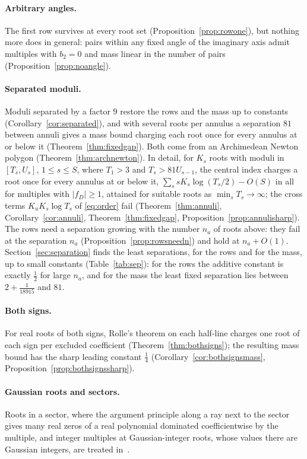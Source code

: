 \documentclass[11pt]{article}
\begin{document}
\paragraph{Arbitrary angles.}  The first row survives at every root set
(Proposition~\ref{prop:rowone}), but nothing more does in general: pairs
within any fixed angle of the imaginary axis admit multiples with $b_2=0$
and mass linear in the number of pairs (Proposition~\ref{prop:noangle}).

\paragraph{Separated moduli.}  Moduli separated by a factor $9$ restore the
rows and the mass up to constants (Corollary~\ref{cor:separated}), and with
several roots per annulus a separation $81$ between annuli gives a mass
bound charging each root once for every annulus at or below it
(Theorem~\ref{thm:fixedgap}).  Both come from an Archimedean Newton polygon
(Theorem~\ref{thm:archnewton}).  In detail, for $K_s$ roots with moduli in $[T_s,U_s]$,
$1\le s\le S$, where $T_1>3$ and $T_s>81U_{s-1}$, the central index charges a
root once for every annulus at or below it,
$\sum_ssK_s\log(T_s/2)-O(S)$ in all for multiples with $|f_D|\ge1$, attained
for suitable roots as $\min_sT_s\to\infty$; the cross terms
$K_uK_s\log T_s$ of \eqref{eq:order} fail (Theorem~\ref{thm:annuli},
Corollary~\ref{cor:annuli}, Theorem~\ref{thm:fixedgap},
Proposition~\ref{prop:annulisharp}).  The rows need a separation growing
with the number $n_a$ of roots above: they fail at the separation $n_a$
(Proposition~\ref{prop:rowsneedn}) and hold at $n_a+O(1)$.
Section~\ref{sec:separation} finds the least separations, for the rows
and for the mass, up to small constants (Table~\ref{tab:sep}): for the
rows the additive constant is exactly $\frac12$ for large $n_a$, and for
the mass the least fixed separation lies between $2+\frac1{18915}$ and
$81$.

\paragraph{Both signs.}  For real roots of both signs, Rolle's theorem on
each half-line charges one root of each sign per excluded coefficient
(Theorem~\ref{thm:bothsigns}); the resulting mass bound has the sharp
leading constant $\frac14$ (Corollary~\ref{cor:bothsignsmass},
Proposition~\ref{prop:bothsignssharp}).

\paragraph{Gaussian roots and sectors.}  Roots in a sector, where the
argument principle along a ray next to the sector gives many real zeros of
a real polynomial dominated coefficientwise by the multiple, and integer
multiples at Gaussian-integer roots, whose values there are Gaussian
integers, are treated in~\cite{coefficient-mass-sectors}.
\end{document}
